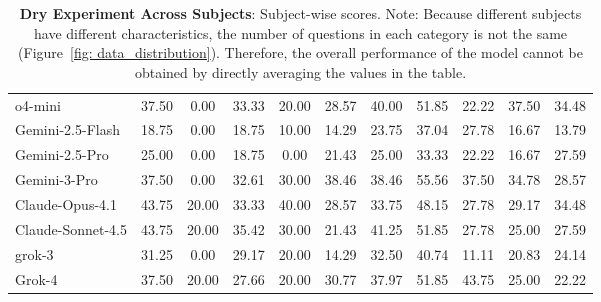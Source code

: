 \begin{table}[t]
{\begin{tabular}{lcccccccccc}
o4-mini & 37.50 & 0.00 & 33.33 & 20.00 & 28.57 & 40.00 & 51.85 & 22.22 & 37.50 & 34.48 \\
Gemini-2.5-Flash & 18.75 & 0.00 & 18.75 & 10.00 & 14.29 & 23.75 & 37.04 & 27.78 & 16.67 & 13.79 \\
Gemini-2.5-Pro & 25.00 & 0.00 & 18.75 & 0.00 & 21.43 & 25.00 & 33.33 & 22.22 & 16.67 & 27.59 \\
Gemini-3-Pro & 37.50 & 0.00 & 32.61 & 30.00 & 38.46 & 38.46 & 55.56 & 37.50 & 34.78 & 28.57 \\
Claude-Opus-4.1 & 43.75 & 20.00 & 33.33 & 40.00 & 28.57 & 33.75 & 48.15 & 27.78 & 29.17 & 34.48 \\
Claude-Sonnet-4.5 & 43.75 & 20.00 & 35.42 & 30.00 & 21.43 & 41.25 & 51.85 & 27.78 & 25.00 & 27.59 \\
grok-3 & 31.25 & 0.00 & 29.17 & 20.00 & 14.29 & 32.50 & 40.74 & 11.11 & 20.83 & 24.14 \\
Grok-4 & 37.50 & 20.00 & 27.66 & 20.00 & 30.77 & 37.97 & 51.85 & 43.75 & 25.00 & 22.22 \\
\bottomrule
\end{tabular}
}
\caption{\textbf{Dry Experiment Across Subjects}: Subject-wise scores. Note: Because different subjects have different characteristics, the number of questions in each category is not the same (Figure~\ref{fig: data_distribution}). Therefore, the overall performance of the model cannot be obtained by directly averaging the values in the table.}
\label{tab:dry_subject_metric_table2}
\end{table}

